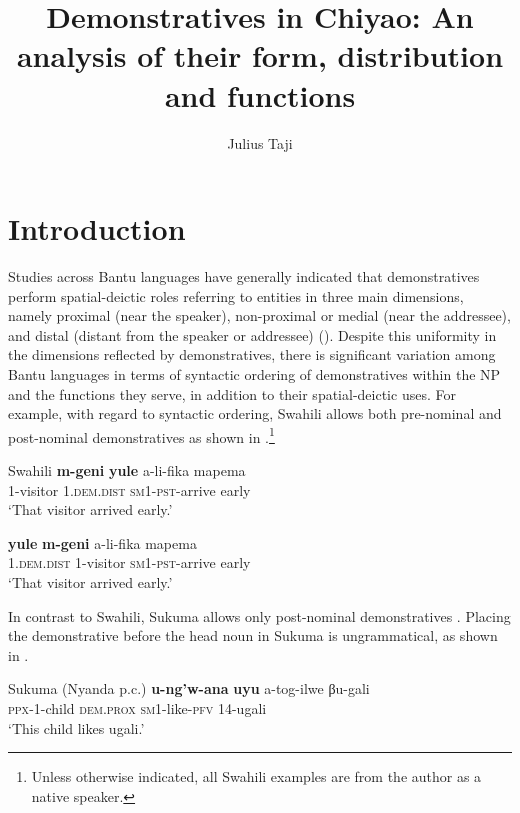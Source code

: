\documentclass[output=paper,
            colorlinks, citecolor=brown
            ,draftmode
		  ]{langscibook}
\author{Julius Taji\orcid{}\affiliation{University of Dar es Salaam}}
\title[Demonstratives in Chiyao]{Demonstratives in Chiyao: An analysis of their form, distribution and functions}
\begin{document}
\maketitle 


\section{Introduction}\label{sec:taji:1}

Studies across Bantu languages have generally indicated that demonstratives perform spatial-deictic roles referring to entities in three main dimensions, namely proximal (near the speaker), non-proximal or medial (near the addressee), and distal (distant from the speaker or addressee) (\citealt{Nicolle2007a,Nicolle2007b, Asiimwe2014}). Despite this uniformity in the dimensions reflected by demonstratives, there is significant variation among Bantu languages in terms of syntactic ordering of demonstratives within the NP and the functions they serve, in addition to their spatial-deictic uses. For example, with regard to syntactic ordering, Swahili allows both pre-nominal and post-nominal demonstratives as shown in .\footnote{Unless otherwise indicated, all Swahili examples are from the author as a native speaker.}

\ea Swahili
    \label{ex:taji:1}
    \ea\label{ex:taji:1a} \gll   \textbf{m-geni}      \textbf{yule}                      a-li-fika                  mapema \\
1-visitor    1.\textsc{dem.dist}        \textsc{sm1-pst}-arrive    early\\
        \glt ‘That visitor arrived early.’

    \ex\label{ex:taji:1b} \gll    \textbf{yule}                        \textbf{m-geni}              a-li-fika                  mapema\\
1.\textsc{dem.dist}       1-visitor            \textsc{sm1-pst}-arrive    early\\
        \glt ‘That visitor arrived early.’                                                  
        \z
\z

In contrast to Swahili, Sukuma allows only post-nominal demonstratives . Placing the demonstrative before the head noun in Sukuma is ungrammatical, as shown in . 

\ea Sukuma (Nyanda p.c.)
    \label{ex:taji:2}
    \ea\label{ex:taji:2a} \gll  \textbf{u-ng’w-ana}          \textbf{uyu}                      a-tog-ilwe                βu-gali\\
      \textsc{ppx}-1-child          \textsc{dem.prox}      \textsc{sm1}-like-\textsc{pfv}        14-ugali\\
      \glt ‘This child likes ugali.’
\end{document}
